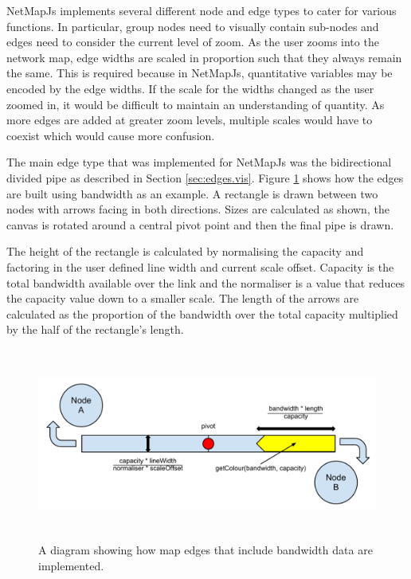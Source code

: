 \documentclass[11pt, a4paper]{article}
\begin{document}
NetMapJs implements several different node and edge types to cater for various
functions. In particular, group nodes need to visually contain sub-nodes and
edges need to consider the current level of zoom. As the user zooms into the
network map, edge widths are scaled in proportion such that they always remain
the same. This is required because in NetMapJs, quantitative variables may be
encoded by the edge widths. If the scale for the widths changed as the user
zoomed in, it would be difficult to maintain an understanding of quantity. As
more edges are added at greater zoom levels, multiple scales would have to
coexist which would cause more confusion.

The main edge type that was implemented for NetMapJs was the bidirectional
divided pipe as described in Section \ref{sec:edges.vis}. Figure
\ref{fig:nodesedges1.0} shows how the edges are built using bandwidth as an
example. A rectangle is drawn between two nodes with arrows facing in both
directions. Sizes are calculated as shown, the canvas is rotated around a
central pivot point and then the final pipe is drawn.

The height of the rectangle is calculated by normalising the capacity and
factoring in the user defined line width and current scale offset.
Capacity is the total bandwidth available over the link and the normaliser is a
value that reduces the capacity value down to a smaller scale. The length of the
arrows are calculated as the proportion of the bandwidth over the total capacity
multiplied by the half of the rectangle's length.



\begin{figure}
\centering
\includegraphics[width=170mm,height=63.24mm]{assets/nodesedges1-0.pdf}
\caption{A diagram showing how map edges that include bandwidth data are implemented.}
\label{fig:nodesedges1.0}
\end{figure}
\end{document}
